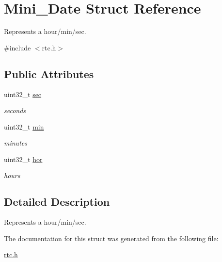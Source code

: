 \hypertarget{struct_mini___date}{}\section{Mini\+\_\+\+Date Struct Reference}
\label{struct_mini___date}


Represents a hour/min/sec.  




{\ttfamily \#include $<$rtc.\+h$>$}

\subsection*{Public Attributes}
\begin{DoxyCompactItemize}
\item 
uint32\+\_\+t \mbox{\hyperlink{group__rtc_gaf04de8c74857b4c272fab97e2c86c6e5}{sec}}
\begin{DoxyCompactList}\small\item\em seconds \end{DoxyCompactList}\item 
uint32\+\_\+t \mbox{\hyperlink{group__rtc_ga057686fc8ec2afc5a4859109bfee257a}{min}}
\begin{DoxyCompactList}\small\item\em minutes \end{DoxyCompactList}\item 
uint32\+\_\+t \mbox{\hyperlink{group__rtc_gad8a3e5a41f6368d916d09efb9b99442e}{hor}}
\begin{DoxyCompactList}\small\item\em hours \end{DoxyCompactList}\end{DoxyCompactItemize}


\subsection{Detailed Description}
Represents a hour/min/sec. 

The documentation for this struct was generated from the following file\+:\begin{DoxyCompactItemize}
\item 
\mbox{\hyperlink{rtc_8h}{rtc.\+h}}\end{DoxyCompactItemize}
